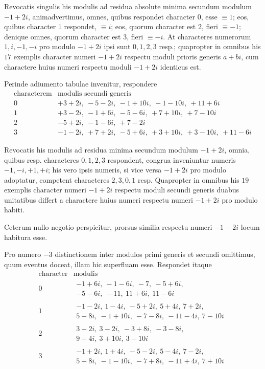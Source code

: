 Revocatis singulis his modulis ad residua absolute minima secundum modulum $-1+2i$, animadvertimus, omnes, quibus respondet character $0$, esse $\equiv1$; eos, quibus character $1$ respondet, $\equiv i$; eos, quorum character est $2$, fieri $\equiv-1$; denique omnes, quorum character est $3$, fieri $\equiv-i$. At characteres numerorum $1,i,-1,-i$ pro modulo $-1+2i$ ipsi sunt $0,1,2,3$ resp.; quapropter in omnibus his $17$ exemplis character numeri $-1+2i$ respectu moduli prioris generis $a+bi$, cum charactere huius numeri respectu moduli $-1+2i$ identicus est.

Perinde adiumento tabulae invenitur, respondere
\[
\begin{array}{c|l}
\text{characterem}&\text{modulis secundi generis}\\\hline
0&+3+2i,\ -5-2i,\ -1+10i,\ -1-10i,\ +11+6i\\
1&+3-2i,\ -1+6i,\ -5-6i,\ +7+10i,\ +7-10i\\
2&-5+2i,\ -1-6i,\ +7-2i\\
3&-1-2i,\ +7+2i,\ -5+6i,\ +3+10i,\ +3-10i,\ +11-6i
\end{array}
\]

Revocatis his modulis ad residua minima secundum modulum $-1+2i$, omnia, quibus resp. characteres $0,1,2,3$ respondent, congrua inveniuntur numeris $-1,-i,+1,+i$; his vero ipsis numeris, si vice versa $-1+2i$ pro modulo adoptatur, competent characteres $2,3,0,1$ resp. Quapropter in omnibus his $19$ exemplis character numeri $-1+2i$ respectu moduli secundi generis duabus unitatibus differt a charactere huius numeri respectu numeri $-1+2i$ pro modulo habiti.

Ceterum nullo negotio perspicitur, prorsus similia respectu numeri $-1-2i$ locum habitura esse.

Pro numero $-3$ distinctionem inter modulos primi generis et secundi omittimus, quum eventus doceat, illam hic superfluam esse. Respondet itaque
%
\[
\begin{array}{c|l}
\text{character}&\text{modulis}\\\hline
0&\begin{gathered}-1+6i,\ -1-6i,\ -7,\ -5+6i,\\-5-6i,\ -11,\ 11+6i,\ 11-6i\end{gathered}\\[3pt]
1&\begin{gathered}-1-2i,\ 1-4i,\ -5+2i,\ 5+4i,\ 7+2i,\\5-8i,\ -1+10i,\ -7-8i,\ -11-4i,\ 7-10i\end{gathered}\\[3pt]
2&\begin{gathered}3+2i,\ 3-2i,\ -3+8i,\ -3-8i,\\9+4i,\ 3+10i,\ 3-10i\end{gathered}\\[3pt]
3&\begin{gathered}-1+2i,\ 1+4i,\ -5-2i,\ 5-4i,\ 7-2i,\\5+8i,\ -1-10i,\ -7+8i,\ -11+4i,\ 7+10i\end{gathered}
\end{array}
\]

